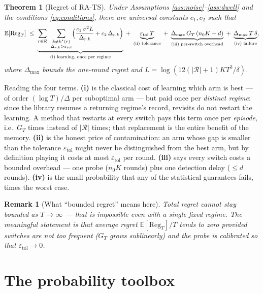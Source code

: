 \documentclass[11pt]{article}
\newtheorem{theorem}{Theorem}
\newtheorem{remark}{Remark}
\newcommand{\E}{\mathbb E}
\newcommand{\Rcal}{\mathcal R}
\newcommand{\Reg}{\mathrm{Reg}}
\newcommand{\etol}{\varepsilon_{\mathrm{tol}}}
\begin{document}
\begin{theorem}[Regret of RA-TS]
\label{thm:main}
Under Assumptions \ref{ass:noise}--\ref{ass:dwell} and the conditions \eqref{eq:conditions}, there are universal constants $c_1,c_2$ such that
\begin{equation}
    \E[\Reg_T]
    \;\le\;
    \underbrace{\sum_{r\in\Rcal}\ \sum_{\substack{k\ne k^\star(r)\\ \Delta_{r,k}>\etol}}
    \Bigl(\frac{c_1\,\sigma^2L}{\Delta_{r,k}}+c_2\,\Delta_{r,k}\Bigr)}_{\text{(i) learning, once per regime}}
    \;+\;
    \underbrace{\etol\,T}_{\text{(ii) tolerance}}
    \;+\;
    \underbrace{\Delta_{\max}\,G_T\,(n_0K+d)}_{\text{(iii) per-switch overhead}}
    \;+\;
    \underbrace{\Delta_{\max}\,T\,\delta}_{\text{(iv) failure}} ,
    \label{eq:mainbound}
\end{equation}
where $\Delta_{\max}$ bounds the one-round regret and $L=\log(12(|\Rcal|{+}1)KT^3/\delta)$.
\end{theorem}

Reading the four terms. \textbf{(i)} is the classical cost of learning which arm is best --- of order $(\log T)/\Delta$ per suboptimal arm --- but paid once per \emph{distinct regime}: since the library resumes a returning regime's record, revisits do not restart the learning. A method that restarts at every switch pays this term once per \emph{episode}, i.e.\ $G_T$ times instead of $|\Rcal|$ times; that replacement is the entire benefit of the memory. \textbf{(ii)} is the honest price of contamination: an arm whose gap is smaller than the tolerance $\etol$ might never be distinguished from the best arm, but by definition playing it costs at most $\etol$ per round. \textbf{(iii)} says every switch costs a bounded overhead --- one probe ($n_0K$ rounds) plus one detection delay ($\le d$ rounds). \textbf{(iv)} is the small probability that any of the statistical guarantees fails, times the worst case.

\begin{remark}[What ``bounded regret'' means here]
Total regret cannot stay bounded as $T\to\infty$ --- that is impossible even with a single fixed regime. The meaningful statement is that \emph{average} regret $\E[\Reg_T]/T$ tends to zero provided switches are not too frequent ($G_T$ grows sublinearly) and the probe is calibrated so that $\etol\to0$.
\end{remark}

\section{The probability toolbox}
\end{document}
